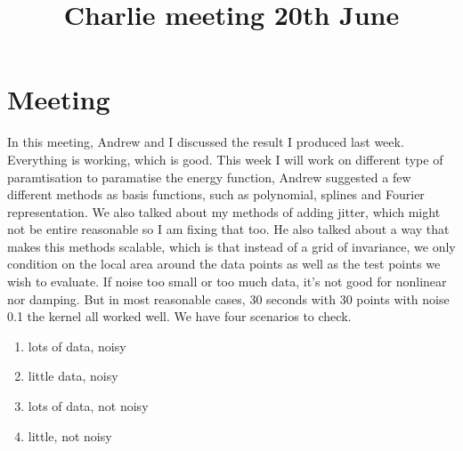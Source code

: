 \documentclass{article}
\title{\vspace{-3cm}Charlie meeting 20th June\vspace{-3em}}
\author{}
\date{}
\begin{document}
\maketitle
\section*{Meeting}
In this meeting, Andrew and I discussed the result I produced last week. 
Everything is working, which is good. 
This week I will work on different type of paramtisation to paramatise the energy function, Andrew suggested a few different methods as basis functions, such as polynomial, splines and Fourier representation. 
We also talked about my methods of adding jitter, which might not be entire reasonable so I am fixing that too. 
He also talked about a way that makes this methods scalable, which is that instead of a grid of invariance, we only condition on the local area around the data points as well as the test points we wish to evaluate. 
If noise too small or too much data, it's not good for nonlinear nor damping.
But in most reasonable cases, 30 seconds with 30 points with noise 0.1 the kernel all worked well.
We have four scenarios to check.
\begin{enumerate}
  \item lots of data, noisy
  \item little data, noisy
  \item lots of data, not noisy
  \item little, not noisy
\end{enumerate}
\end{document}
